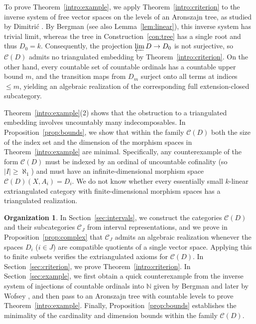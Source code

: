 \documentclass[a4paper,reqno,10pt]{amsart}
\numberwithin{equation}{section}
\theoremstyle{definition}
\newtheorem*{organization}{Organization}
\newcommand{\C}{\mathcal C}
\begin{document}
To prove Theorem~\ref{intro:example}, we apply Theorem~\ref{intro:criterion} to
the inverse system of free vector spaces on the levels of an Aronszajn tree, as
studied by Dimitri\'c \cite[FC2, pp.~20--21]{Di}. By Bergman \cite[p.~6, argument
preceding Corollary~8]{Be2} (see also Lemma~\ref{lem:linear}), this inverse system
has trivial limit, whereas the tree in Construction~\ref{con:tree} has a single
root and thus $D_0=k$. Consequently, the projection $\varprojlim D\to D_0$ is
not surjective, so $\C(D)$ admits no triangulated embedding by
Theorem~\ref{intro:criterion}. On the other hand, every countable set of
countable ordinals has a countable upper bound $m$, and the transition maps
from $D_m$ surject onto all terms at indices $\le m$, yielding an algebraic
realization of the corresponding full extension-closed subcategory.

Theorem~\ref{intro:example}(2) shows that the obstruction to a triangulated
embedding involves uncountably many indecomposables. In
Proposition~\ref{prop:bounds}, we show that within the family $\C(D)$ both the
size of the index set and the dimension of the morphism spaces in
Theorem~\ref{intro:example} are minimal. Specifically, any counterexample of
the form $\C(D)$ must be indexed by an ordinal of uncountable cofinality (so
$|I|\ge\aleph_1$) and must have an infinite-dimensional morphism space
$\C(D)(X,A_i)=D_i$. We do not know whether every essentially small $k$-linear
extriangulated category with finite-dimensional morphism spaces has a
triangulated realization.

\begin{organization}
In Section~\ref{sec:intervals}, we construct the categories $\C(D)$ and their
subcategories $\C_J$ from interval representations, and we prove in
Proposition~\ref{prop:complex} that $\C_J$ admits an algebraic realization
whenever the spaces $D_i$ ($i\in J$) are compatible quotients of a single
vector space. Applying this to finite subsets verifies the extriangulated
axioms for $\C(D)$. In Section~\ref{sec:criterion}, we prove
Theorem~\ref{intro:criterion}. In Section~\ref{sec:example}, we first obtain a
quick counterexample from the inverse system of injections of countable
ordinals into $\mathbb N$ given by Bergman \cite[p.~7]{Be2}
and later by Wofsey \cite{Wo}, and then pass to an
Aronszajn tree with countable levels to prove Theorem~\ref{intro:example}.
Finally, Proposition~\ref{prop:bounds} establishes the minimality of the
cardinality and dimension bounds within the family $\C(D)$.
\end{organization}
\end{document}
